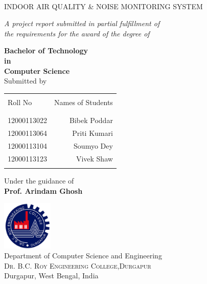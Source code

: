 \begin{titlepage}

\begin{center}

\textup\\

\Large  {INDOOR AIR QUALITY \& NOISE MONITORING SYSTEM}\\
\vspace{.3in}

       \small \emph{ A project report submitted in partial fulfillment of\\
        the requirements for the award of the degree of}
        \vspace{.3in}

       {\bf Bachelor of Technology \\in\\ Computer Science }\\

\normalsize Submitted by \\
\begin{table}[h]
\centering
\begin{tabular}{lr}\hline \\
Roll No & Names of Students \\ \\ \hline
\\
12000113022 & Bibek Poddar \\
12000113064 & Priti Kumari  \\
12000113104 & Soumyo Dey \\ 
12000113123 & Vivek Shaw \\ \\ \hline 
\end{tabular}
\end{table}

\vspace{.1in}
Under the guidance of\\
{\textbf{Prof. Arindam Ghosh}}\\

\vspace{.3in}

\includegraphics[width=0.18\textwidth]{./logo}\\[0.1in]
\Large{Department of Computer Science and Engineering}\\
\normalsize
\textsc{Dr. B.C. Roy Engineering College,Durgapur}\\
Durgapur, West Bengal, India  \\
\vspace{0.2cm}


\end{center}

\end{titlepage}
